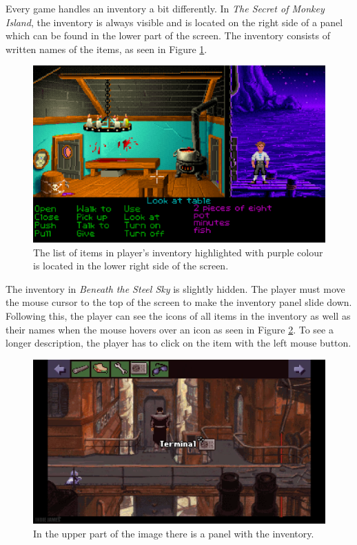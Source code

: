 Every game handles an inventory a bit differently. In \textit{The Secret of Monkey Island}, the inventory is always visible and is located on the right side of a panel which can be found in the lower part of the screen. The inventory consists of written names of the items, as seen in Figure \ref{fig:I-TSoMI}.
\begin{figure}[H]
\centering
\includegraphics[width=.8\linewidth]{img/TSoMI.png}
\caption{The list of items in player's inventory highlighted with purple colour is located in the lower right side of the screen.}
\label{fig:I-TSoMI}
\end{figure}

The inventory in \textit{Beneath the Steel Sky} is slightly hidden. The player must move the mouse cursor to the top of the screen to make the inventory panel slide down. Following this, the player can see the icons of all items in the inventory as well as their names when the mouse hovers over an icon as seen in Figure \ref{fig:I-BaSS}. To see a longer description, the player has to click on the item with the left mouse button.
\begin{figure}[H]
\centering
\includegraphics[width=1.\linewidth]{img/BaSS.png}
\caption{In the upper part of the image there is a panel with the inventory.}
\label{fig:I-BaSS}
\end{figure}

